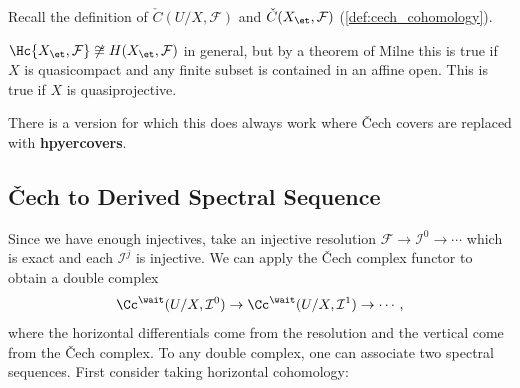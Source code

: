 Recall the definition of \(\check{C}(U/X, \mathcal{F})\) and
\(\check{C}(X_\et, \mathcal{F})\) (\cref{def:cech_cohomology}).

\begin{warnings}

\(\Hc{X_\et, \mathcal{F}} \not\cong H(X_\et, \mathcal{F})\) in general,
but by a theorem of Milne this is true if \(X\) is quasicompact and any
finite subset is contained in an affine open. This is true if \(X\) is
quasiprojective.

\end{warnings}

\begin{remark}

There is a version for which this does always work where Čech covers are
replaced with \textbf{hpyercovers}.

\end{remark}

\hypertarget{ux10dech-to-derived-spectral-sequence}{%
\subsection{Čech to Derived Spectral
Sequence}\label{ux10dech-to-derived-spectral-sequence}}

Since we have enough injectives, take an injective resolution
\(\mathcal{F}\to \mathcal{I}^0 \to \cdots\) which is exact and each
\(\mathcal{I}^j\) is injective. We can apply the Čech complex functor to
obtain a double complex
\begin{align*}
\Cc^\wait(U/X, \mathcal{I}^0) \to \Cc^\wait(U/X, \mathcal{I}^1) \to \cdots
,\end{align*} where the horizontal differentials come from the
resolution and the vertical come from the Čech complex. To any double
complex, one can associate two spectral sequences. First consider taking
horizontal cohomology:

\begin{center}
\end{center}

